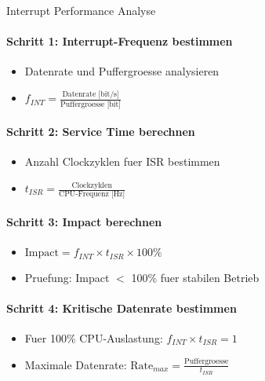 \begin{KR}{Interrupt Performance Analyse}
    \paragraph{Schritt 1: Interrupt-Frequenz bestimmen}
    \begin{itemize}
        \item Datenrate und Puffergroesse analysieren
        \item $f_{INT} = \frac{\text{Datenrate [bit/s]}}{\text{Puffergroesse [bit]}}$
    \end{itemize}
    
    \paragraph{Schritt 2: Service Time berechnen}
    \begin{itemize}
        \item Anzahl Clockzyklen fuer ISR bestimmen
        \item $t_{ISR} = \frac{\text{Clockzyklen}}{\text{CPU-Frequenz [Hz]}}$
    \end{itemize}
    
    \paragraph{Schritt 3: Impact berechnen}
    \begin{itemize}
        \item $\text{Impact} = f_{INT} \times t_{ISR} \times 100\%$
        \item Pruefung: Impact $<$ 100\% fuer stabilen Betrieb
    \end{itemize}
    
    \paragraph{Schritt 4: Kritische Datenrate bestimmen}
    \begin{itemize}
        \item Fuer 100\% CPU-Auslastung: $f_{INT} \times t_{ISR} = 1$
        \item Maximale Datenrate: $\text{Rate}_{max} = \frac{\text{Puffergroesse}}{t_{ISR}}$
    \end{itemize}
\end{KR}

